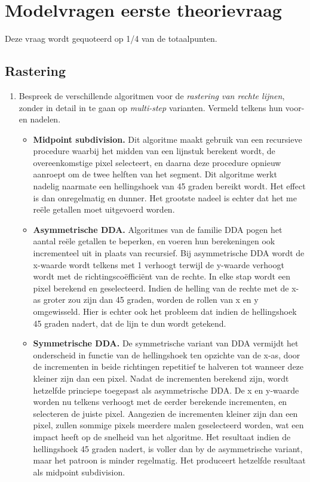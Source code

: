 \documentclass{report}
\newcommand{\vraag}[2]{
	\item #1
	
	#2
}
\begin{document}
	\tableofcontents
	\chapter{Modelvragen eerste theorievraag}
	Deze vraag wordt gequoteerd op 1/4 van de totaalpunten.
	
	\section{Rastering}
	\begin{enumerate}
		\vraag
		{
			Bespreek de verschillende algoritmen voor de \textit{rastering van rechte lijnen}, zonder in detail in te gaan op \textit{multi-step} varianten. Vermeld telkens hun voor- en nadelen. \accentuate{(§1.2 \& §1.2.1)}
		}
		{
			\begin{itemize}
				\item \textbf{Midpoint subdivision.} Dit algoritme maakt gebruik van een recursieve procedure waarbij het midden van een lijnstuk berekent wordt, de overeenkomstige pixel selecteert, en daarna deze procedure opnieuw aanroept om de twee helften van het segment. Dit algoritme werkt nadelig naarmate een hellingshoek van 45 graden bereikt wordt. Het effect is dan onregelmatig en dunner. Het grootste nadeel is echter dat het me reële getallen moet uitgevoerd worden.
				
				\item \textbf{Asymmetrische DDA.} Algoritmes van de familie DDA pogen het aantal reële getallen te beperken, en voeren hun berekeningen ook incrementeel uit in plaats van recursief. Bij asymmetrische DDA wordt de x-waarde wordt telkens met 1 verhoogt terwijl de y-waarde verhoogt wordt met de richtingscoëfficiënt van de rechte. In elke stap wordt een pixel berekend en geselecteerd. Indien de helling van de rechte met de x-as groter zou zijn dan 45 graden, worden de rollen van x en y omgewisseld. Hier is echter ook het probleem dat indien de hellingshoek 45 graden nadert, dat de lijn te dun wordt getekend.
				
				\item \textbf{Symmetrische DDA.} De symmetrische variant van DDA vermijdt het onderscheid in functie van de hellingshoek ten opzichte van de x-as, door de incrementen in beide richtingen repetitief te halveren tot wanneer deze kleiner zijn dan een pixel. Nadat de incrementen berekend zijn, wordt hetzelfde princiepe toegepast als asymmetrische DDA. De x en y-waarde worden nu telkens verhoogt met de eerder berekende incrementen, en selecteren de juiste pixel. Aangezien de incrementen kleiner zijn dan een pixel, zullen sommige pixels meerdere malen geselecteerd worden, wat een impact heeft op de snelheid van het algoritme. Het resultaat indien de hellingshoek 45 graden nadert, is voller dan by de asymmetrische variant, maar het patroon is minder regelmatig. Het produceert hetzelfde resultaat als midpoint subdivision.
				

\end{itemize}}
\end{enumerate}
\end{document}
